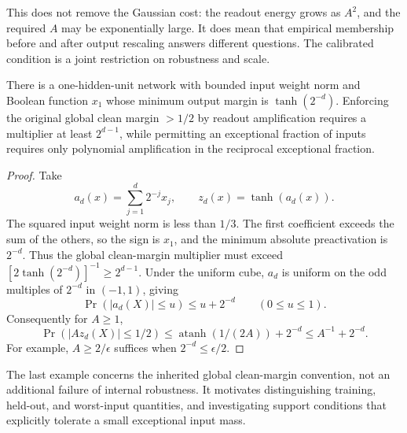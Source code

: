 This does not remove the Gaussian cost: the readout energy grows as $A^2$,
and the required $A$ may be exponentially large. It does mean that empirical
membership before and after output rescaling answers different questions.
The calibrated condition is a joint restriction on robustness and scale.

\begin{proposition}
There is a one-hidden-unit network with bounded input weight norm and
Boolean function $x_1$ whose minimum output margin is $\tanh(2^{-d})$.
Enforcing the original global clean margin $>1/2$ by readout amplification
requires a multiplier at least $2^{d-1}$, while permitting an exceptional
fraction of inputs requires only polynomial amplification in the reciprocal
exceptional fraction.
\end{proposition}
\begin{proof}
Take
\[
 a_d(x)=\sum_{j=1}^d2^{-j}x_j,\qquad z_d(x)=\tanh(a_d(x)).
\]
The squared input weight norm is less than $1/3$. The first coefficient
exceeds the sum of the others, so the sign is $x_1$, and the minimum
absolute preactivation is $2^{-d}$. Thus the global clean-margin multiplier
must exceed $[2\tanh(2^{-d})]^{-1}\ge2^{d-1}$.
Under the uniform cube, $a_d$ is uniform on the odd multiples of $2^{-d}$
in $(-1,1)$, giving
\[
 \Pr(|a_d(X)|\le u)\le u+2^{-d}\qquad(0\le u\le1).
\]
Consequently for $A\ge1$,
\[
 \Pr(|Az_d(X)|\le1/2)
 \le\operatorname{atanh}(1/(2A))+2^{-d}
 \le A^{-1}+2^{-d}.
\]
For example, $A\ge2/\epsilon$ suffices when $2^{-d}\le\epsilon/2$.
\end{proof}

The last example concerns the inherited global clean-margin convention,
not an additional failure of internal robustness. It motivates distinguishing
training, held-out, and worst-input quantities, and investigating support
conditions that explicitly tolerate a small exceptional input mass.

